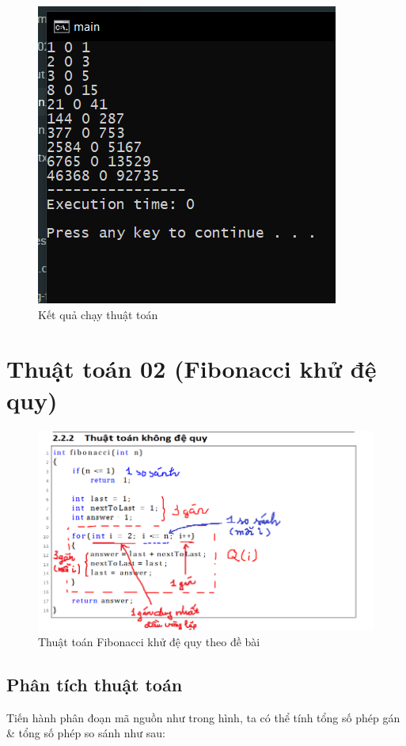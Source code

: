 \documentclass[12pt]{article}
\begin{document}
\begin{figure}[H]
\centering
\includegraphics[]{result-de-quy.PNG}
\caption{Kết quả chạy thuật toán}
\end{figure}


\section{Thuật toán 02 (Fibonacci khử đệ quy)}
\begin{figure}[H]
\centering
\includegraphics[scale=0.8]{fibo-khu-de-quy.png}
\caption{Thuật toán Fibonacci khử đệ quy theo đề bài}
\end{figure}

\subsection{Phân tích thuật toán}
Tiến hành phân đoạn mã nguồn như trong hình, ta có thể tính tổng số phép gán \& tổng số phép so sánh như sau:
\end{document}
